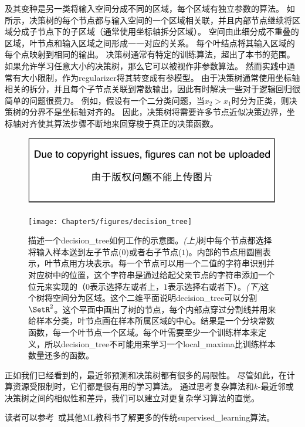 及其变种是另一类将输入空间分成不同的区域，每个区域有独立参数的算法\citep{Breiman84}。
如所示，决策树的每个节点都与输入空间的一个区域相关联，并且内部节点继续将区域分成子节点下的子区域（通常使用坐标轴拆分区域）。
空间由此细分成不重叠的区域，叶节点和输入区域之间形成一一对应的关系。
每个叶结点将其输入区域的每个点映射到相同的输出。
决策树通常有特定的训练算法，超出了本书的范围。
如果允许学习任意大小的决策树，那么它可以被视作非参数算法。
然而实践中通常有大小限制，作为\gls{regularizer}将其转变成有参模型。
由于决策树通常使用坐标轴相关的拆分，并且每个子节点关联到常数输出，因此有时解决一些对于逻辑回归很简单的问题很费力。
例如，假设有一个二分类问题，当$x_2>x_1$时分为正类，则决策树的分界不是坐标轴对齐的。
因此，决策树将需要许多节点近似决策边界，坐标轴对齐使其算法步骤不断地来回穿梭于真正的决策函数。

\begin{figure}[!htb]
\ifOpenSource
\centerline{\includegraphics{figure.pdf}}
\else
\centerline{\texttt{[image: Chapter5/figures/decision\_tree]}}
\fi
\caption{描述一个\gls{decision_tree}如何工作的示意图。\emph{(上)}树中每个节点都选择将输入样本送到左子节点($0$)或者右子节点($1$)。内部的节点用圆圈表示，叶节点用方块表示。每一个节点可以用一个二值的字符串识别并对应树中的位置，这个字符串是通过给起父亲节点的字符串添加一个位元来实现的（$0$表示选择左或者上，$1$表示选择右或者下）。\emph{(下)}这个树将空间分为区域。这个二维平面说明\gls{decision_tree}可以分割$\SetR^2$。这个平面中画出了树的节点，每个内部点穿过分割线并用来给样本分类，叶节点画在样本所属区域的中心。结果是一个分块常数函数，每一个叶节点一个区域。每个叶需要至少一个训练样本来定义，所以\gls{decision_tree}不可能用来学习一个\gls{local_maxima}比训练样本数量还多的函数。}
\label{fig:chap5_decision_tree}
\end{figure}

正如我们已经看到的，最近邻预测和决策树都有很多的局限性。
尽管如此，在计算资源受限制时，它们都是很有用的学习算法。
通过思考复杂算法和$k$-最近邻或决策树之间的相似性和差异，我们可以建立对更复杂学习算法的直觉。

读者可以参考~\cite{MurphyBook2012,bishop-book2006,Hastie2001}或其他\gls{ML}教科书了解更多的传统\gls{supervised_learning}算法。

